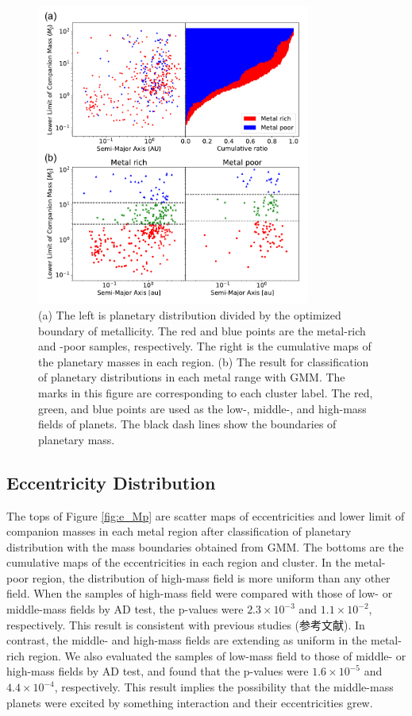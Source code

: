 \documentclass[twocolumn, dvipdfmx]{aastex62}
\begin{document}
\begin{CJK*}{UTF8}{min}
\begin{figure}[t]
\begin{center}
\includegraphics[width=9cm]{../../../Figure/a_Mp.pdf}
\caption{(a) The left is planetary distribution divided by the optimized boundary of metallicity. The red and blue points are the metal-rich and -poor samples, respectively. The right is the cumulative maps of the planetary masses in each region. (b) The result for classification of planetary distributions in each metal range with GMM. The marks in this figure are corresponding to each cluster label. The red, green, and blue points are used as the low-, middle-, and high-mass fields of planets. The black dash lines show the boundaries of planetary mass. \label{fig:a_Mp}}
\end{center}
\end{figure}


\subsection{Eccentricity Distribution} \label{subsec:eccentricity}

The tops of Figure \ref{fig:e_Mp} are scatter maps of eccentricities and lower limit of companion masses in each metal region after classification of planetary distribution with the mass boundaries obtained from GMM. The bottoms are the cumulative maps of the eccentricities in each region and cluster. In the metal-poor region, the distribution of high-mass field is more uniform than any other field. When the samples of high-mass field were compared with those of low- or middle-mass fields by AD test, the p-values were $2.3\times10^{-3}$ and $1.1\times10^{-2}$, respectively. This result is consistent with previous studies (参考文献). In contrast, the middle- and high-mass fields are extending as uniform in the metal-rich region. We also evaluated the samples of low-mass field to those of middle- or high-mass fields by AD test, and found that the p-values were $1.6\times10^{-5}$ and $4.4\times10^{-4}$, respectively. This result implies the possibility that the middle-mass planets were excited by something interaction and their eccentricities
grew.


\end{CJK*}
\end{document}
